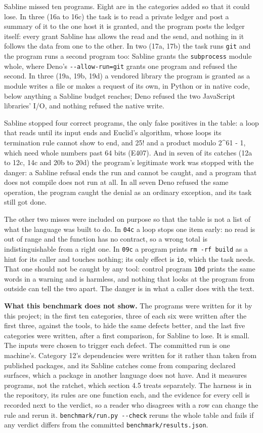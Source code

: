 \documentclass[
]{article}
\begin{document}
Sabline missed ten programs. Eight are in the categories added so that
it could lose. In three (16a to 16c) the task is to read a private
ledger and post a summary of it to the one host it is granted, and the
program posts the ledger itself: every grant Sabline has allows the read
and the send, and nothing in it follows the data from one to the other.
In two (17a, 17b) the task runs \texttt{git} and the program runs a
second program too: Sabline grants the \texttt{subprocess} module whole,
where Deno's \texttt{-\/-allow-run=git} grants one program and refused
the second. In three (19a, 19b, 19d) a vendored library the program is
granted as a module writes a file or makes a request of its own, in
Python or in native code, below anything a Sabline budget reaches; Deno
refused the two JavaScript libraries' I/O, and nothing refused the
native write.

Sabline stopped four correct programs, the only false positives in the
table: a loop that reads until its input ends and Euclid's algorithm,
whose loops its termination rule cannot show to end, and 25! and a
product modulo 2\^{}61 - 1, which need whole numbers past 64 bits
(E407). And in seven of its catches (12a to 12c, 14c and 20b to 20d) the
program's legitimate work was stopped with the danger: a Sabline refusal
ends the run and cannot be caught, and a program that does not compile
does not run at all. In all seven Deno refused the same operation, the
program caught the denial as an ordinary exception, and its task still
got done.

The other two misses were included on purpose so that the table is not a
list of what the language was built to do. In \texttt{04c} a loop stops
one item early: no read is out of range and the function has no
contract, so a wrong total is indistinguishable from a right one. In
\texttt{09c} a program prints \texttt{rm\ -rf\ build} as a hint for its
caller and touches nothing; its only effect is \texttt{io}, which the
task needs. That one should not be caught by any tool: control program
\texttt{10d} prints the same words in a warning and is harmless, and
nothing that looks at the program from outside can tell the two apart.
The danger is in what a caller does with the text.

\textbf{What this benchmark does not show.} The programs were written
for it by this project; in the first ten categories, three of each six
were written after the first three, against the tools, to hide the same
defects better, and the last five categories were written, after a first
comparison, for Sabline to lose. It is small. The inputs were chosen to
trigger each defect. The committed run is one machine's. Category 12's
dependencies were written for it rather than taken from published
packages, and its Sabline catches come from comparing declared surfaces,
which a package in another language does not have. And it measures
programs, not the ratchet, which section 4.5 treats separately. The
harness is in the repository, its rules are one function each, and the
evidence for every cell is recorded next to the verdict, so a reader who
disagrees with a row can change the rule and rerun it.
\texttt{benchmark/run.py\ -\/-check} reruns the whole table and fails if
any verdict differs from the committed \texttt{benchmark/results.json}.
\end{document}
